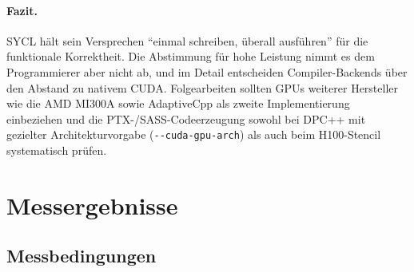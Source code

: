 \documentclass[12pt,a4paper]{article}
\begin{document}
\paragraph{Fazit.}
SYCL hält sein Versprechen \enquote{einmal schreiben, überall ausführen} für
die funktionale Korrektheit. Die Abstimmung für hohe Leistung nimmt es dem
Programmierer aber nicht ab, und im Detail entscheiden Compiler-Backends über
den Abstand zu nativem CUDA\@. Folgearbeiten sollten GPUs weiterer Hersteller
wie die AMD MI300A sowie AdaptiveCpp als zweite Implementierung einbeziehen
und die PTX-/SASS-Codeerzeugung sowohl bei DPC++ mit gezielter
Architekturvorgabe (\texttt{-{}-cuda-\allowbreak gpu-\allowbreak arch}) als auch beim H100-Stencil
systematisch prüfen.

\newpage
\printbibliography[heading=bibintoc, title={Literaturverzeichnis}]

\newpage
\appendix
\section{Messergebnisse}\label{sec:messungen}

\subsection{Messbedingungen}\label{sec:messbedingungen}
\end{document}
